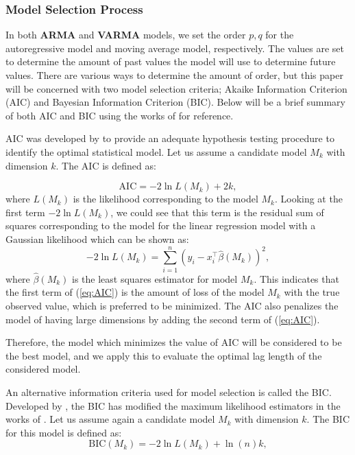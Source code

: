 \subsubsection{Model Selection Process}
In both \textbf{ARMA} and \textbf{VARMA} models, we set the order $p, q$ for the autoregressive model and moving average model, respectively. The values are set to determine the amount of past values the model will use to determine future values. There are various ways to determine the amount of order, but this paper will be concerned with two model selection criteria; Akaike Information Criterion (AIC) and Bayesian Information Criterion (BIC). Below will be a brief summary of both AIC and BIC using the works of \citet{AIC_BIC} for reference. 

AIC was developed by \citet{AIC} to provide an adequate hypothesis testing procedure to identify the optimal statistical model. Let us assume a candidate model $M_{k}$ with dimension $k$. The AIC is defined as:

\begin{equation}\label{eq:AIC}
    \mathrm{AIC}=-2 \ln L\left(M_{k}\right)+2 k,
\end{equation}
where $L(M_{k})$ is the likelihood corresponding to the model $M_{k}$. Looking at the first term $-2 \ln L(M_{k})$, we could see that this term is the residual sum of squares corresponding to the model for the linear regression model with a Gaussian likelihood which can be shown as:
\begin{equation}\label{eq:AIC_first_term}
    -2 \ln L\left(M_{k}\right)=\sum_{i=1}^{n}\left(y_{i}-x_{i}^{\top} \widehat{\beta}\left(M_{k}\right)\right)^{2},
\end{equation}
 where $\widehat{\beta}\left(M_{k}\right)$ is the least squares estimator for model $M_{k}$. This indicates that the first term of (\ref{eq:AIC}) is the amount of loss of the model $M_{k}$ with the true observed value, which is preferred to be minimized. The AIC also penalizes the model of having large dimensions by adding the second term of (\ref{eq:AIC}). 

\noindent Therefore, the model which minimizes the value of AIC will be considered to be the best model, and we apply this to evaluate the optimal lag length of the considered model. 

An alternative information criteria used for model selection is called the BIC. Developed by \citet{BIC}, the BIC has modified the maximum likelihood estimators in the works of \citet{AIC}. Let us assume again a candidate model $M_{k}$ with dimension $k$. The BIC for this model is defined as:
\begin{equation}\label{eq:BIC}
    \mathrm{BIC}\left(M_{k}\right)=-2 \ln L\left(M_{k}\right)+\ln (n) k,
\end{equation}

